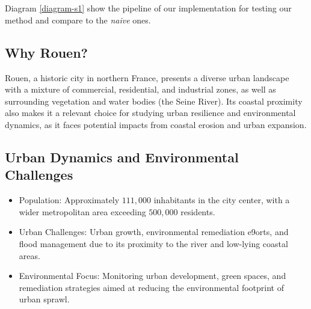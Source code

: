\documentclass[usenatbib]{tjaa}
\begin{document}
\\
\\
Diagram \ref{diagram-s1} show the pipeline of our implementation for testing our method and
compare to the \textit{naive} ones.
\subsection*{Why Rouen?}
\noindent
Rouen, a historic city in northern France, presents a diverse urban landscape with a mixture of
commercial, residential, and industrial zones, as well as surrounding vegetation and water
bodies (the Seine River). Its coastal proximity also makes it a relevant choice for studying urban
resilience and environmental dynamics, as it faces potential impacts from coastal erosion and
urban expansion.

\subsection*{Urban Dynamics and Environmental Challenges}
\begin{itemize}
  \item Population: Approximately $111,000$ inhabitants in the city center, with a wider metropolitan
  area exceeding $500,000$ residents.
  \item Urban Challenges: Urban growth, environmental remediation e9orts, and flood management
  due to its proximity to the river and low-lying coastal areas.
  \item Environmental Focus: Monitoring urban development, green spaces, and remediation
  strategies aimed at reducing the environmental footprint of urban sprawl. 
\end{itemize}
\end{document}

